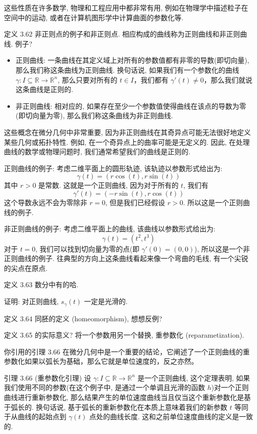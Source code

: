 \documentclass[a4paper]{ctexart}
\begin{document}
{这些性质在许多数学, 物理和工程应用中都非常有用, 例如在物理学中描述粒子在空间中的运动, 或者在计算机图形学中计算曲面的参数化等. 

定义 3.62 非正则点的例子和非正则点. 相应构成的曲线称为正则曲线和非正则曲线. 例子?

\begin{itemize}
  \item 正则曲线: 一条曲线在其定义域上对所有的参数值都有非零的导数(即切向量), 那么我们称这条曲线为正则曲线. 
  换句话说, 如果我们有一个参数化的曲线 $\gamma: I \subseteq \mathbb{R} \rightarrow \mathbb{R}^n$, 
  那么只要对所有的 $t \in I$，我们都有 $\gamma'(t) \neq 0$，那么我们就说这条曲线是正则的.
  \item 非正则曲线: 相对应的, 如果存在至少一个参数值使得曲线在该点的导数为零(即切向量为零), 那么我们称这条曲线为非正则曲线.
\end{itemize}

这些概念在微分几何中非常重要, 因为非正则曲线在其奇异点可能无法很好地定义某些几何或拓扑特性. 
例如, 在一个奇异点上的曲率可能是无定义的. 因此, 在处理曲线的数学或物理问题时, 我们通常希望我们的曲线是正则的. 

正则曲线的例子: 考虑二维平面上的圆形轨迹, 该轨迹以参数形式给出为: 
$$
\gamma(t) = (r\cos(t), r\sin(t))
$$
其中 $r > 0$ 是常数. 这就是一个正则曲线, 因为对于所有的 $t$, 我们有
$$
\gamma'(t) = (-r\sin(t), r\cos(t))
$$
这个导数永远不会为零除非 $r = 0$, 但是我们已经假设 $r > 0$. 所以这是一个正则曲线的例子. 

非正则曲线的例子: 考虑二维平面上的曲线, 该曲线以参数形式给出为:
$$\gamma(t) = (t^2, t^3)$$ 对于 $t=0$, 我们可以找到切向量为零的点(即 $\gamma'(0) = (0,0)$), 
所以这是一个非正则曲线的例子. 往典型的方向上这条曲线看起来像一个弯曲的毛线, 有一个尖锐的尖点在原点. 

定义 3.63 数分中有的哈.

证明: 对正则曲线, $s_\gamma(t)$ 一定是光滑的.

定义 3.64 同胚的定义 (homeomorphism), 想想反例?

定义 3.65 的实际意义? 将一个参数用另一个替换, 重参数化 (reparametization).

你引用的引理 3.66 在微分几何中是一个重要的结论，它阐述了一个正则曲线的重参数化如果以弧长为基础，那么它就是单位速度的，反之亦然。

引理 3.66 (重参数化引理) 设 $\gamma: I \subseteq \mathbb{R} \rightarrow \mathbb{R}^n$ 是一个正则曲线, 这个定理表明, 
如果我们使用不同的参数(在这个例子中, 是通过一个单调且光滑的函数 $h$)对一个正则曲线进行重新参数化, 
那么结果产生的单位速度曲线当且仅当这个重新参数化是基于弧长的. 
换句话说, 基于弧长的重新参数化在本质上意味着我们的新参数 $t$ 等同于从曲线的起始点到 $\gamma(t)$ 点处的曲线长度. 
这和之前单位速度曲线的定义是一致的. 


}
\end{document}
